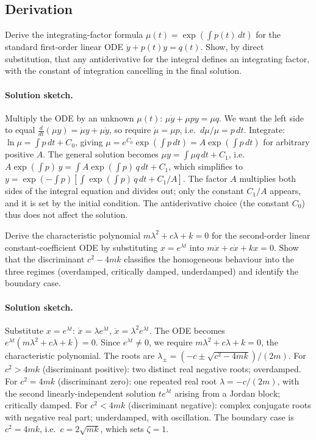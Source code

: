 \subsection*{Derivation}

\begin{exercise}
Derive the integrating-factor formula $\mu(t) = \exp(\int p(t)\,dt)$
for the standard first-order linear ODE $\dot{y} + p(t) y = q(t)$.
Show, by direct substitution, that any antiderivative for the
integral defines an integrating factor, with the constant of
integration cancelling in the final solution.

\paragraph{Solution sketch.} Multiply the ODE by an unknown
$\mu(t)$: $\mu \dot{y} + \mu p y = \mu q$. We want the left side
to equal $\frac{d}{dt}(\mu y) = \dot{\mu} y + \mu \dot{y}$, so
require $\dot{\mu} = \mu p$, i.e.\ $d \mu/\mu = p \, dt$. Integrate:
$\ln \mu = \int p \, dt + C_{0}$, giving $\mu = e^{C_{0}}
\exp(\int p \, dt) = A \exp(\int p \, dt)$ for arbitrary positive
$A$. The general solution becomes $\mu y = \int \mu q \, dt + C_{1}$,
i.e.\ $A \exp(\int p) \, y = \int A \exp(\int p) \, q \, dt + C_{1}$,
which simplifies to $y = \exp(-\int p)[\int \exp(\int p) \, q \,
dt + C_{1}/A]$. The factor $A$ multiplies both sides of the
integral equation and divides out; only the constant $C_{1}/A$
appears, and it is set by the initial condition. The antiderivative
choice (the constant $C_{0}$) thus does not affect the solution.
\end{exercise}

\begin{exercise}
Derive the characteristic polynomial $m \lambda^{2} + c \lambda +
k = 0$ for the second-order linear constant-coefficient ODE by
substituting $x = e^{\lambda t}$ into $m \ddot{x} + c \dot{x} +
k x = 0$. Show that the discriminant $c^{2} - 4 m k$ classifies
the homogeneous behaviour into the three regimes (overdamped,
critically damped, underdamped) and identify the boundary case.

\paragraph{Solution sketch.} Substitute $x = e^{\lambda t}$:
$\dot{x} = \lambda e^{\lambda t}$, $\ddot{x} = \lambda^{2}
e^{\lambda t}$. The ODE becomes $e^{\lambda t}(m \lambda^{2} + c
\lambda + k) = 0$. Since $e^{\lambda t} \neq 0$, we require
$m \lambda^{2} + c \lambda + k = 0$, the characteristic polynomial.
The roots are $\lambda_{\pm} = (-c \pm \sqrt{c^{2} - 4 m k})/(2 m)$.
For $c^{2} > 4 m k$ (discriminant positive): two distinct real
negative roots; overdamped. For $c^{2} = 4 m k$ (discriminant
zero): one repeated real root $\lambda = -c/(2 m)$, with the
second linearly-independent solution $t e^{\lambda t}$ arising
from a Jordan block; critically damped. For $c^{2} < 4 m k$
(discriminant negative): complex conjugate roots with negative
real part; underdamped, with oscillation. The boundary case is
$c^{2} = 4 m k$, i.e.\ $c = 2 \sqrt{m k}$, which sets $\zeta = 1$.
\end{exercise}

